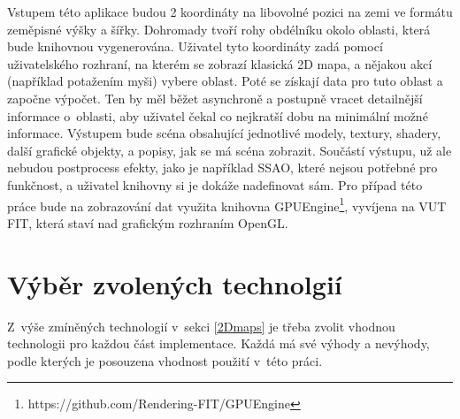 Vstupem této aplikace budou 2 koordináty na libovolné pozici na zemi ve formátu zeměpisné výšky a šířky. Dohromady tvoří rohy obdélníku okolo oblasti, která bude knihovnou vygenerována. Uživatel tyto koordináty zadá pomocí uživatelského rozhraní, na kterém se zobrazí klasická 2D mapa, a nějakou akcí (například potažením myši) vybere oblast. Poté se získají data pro tuto oblast a započne výpočet. Ten by měl běžet asynchroně a postupně vracet detailnější informace o~oblasti, aby uživatel čekal co nejkratší dobu na minimální možné informace.
Výstupem bude scéna obsahující jednotlivé modely, textury, shadery, další grafické objekty, a popisy, jak se má scéna zobrazit. Součástí výstupu, už ale nebudou postprocess efekty, jako je například SSAO, které nejsou potřebné pro funkčnost, a uživatel knihovny si je dokáže nadefinovat sám. Pro případ této práce bude na zobrazování dat využita knihovna GPUEngine\footnote{https://github.com/Rendering-FIT/GPUEngine}, vyvíjena na VUT FIT, která staví nad grafickým rozhraním OpenGL.

\section{Výběr zvolených technolgií}
Z~výše zmíněných technologií v~sekci \ref{2Dmaps} je třeba zvolit vhodnou technologii pro každou část implementace. Každá má své výhody a nevýhody, podle kterých je posouzena vhodnost použití v~této práci.

